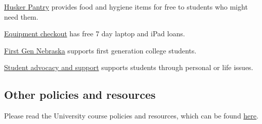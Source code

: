 \documentclass[12pt]{amsart}
\begin{document}
\medskip
\noindent
\href{https://pantry.unl.edu}{Husker Pantry} provides food and hygiene items for free to students who might need them.

\medskip
\noindent
\href{https://services.unl.edu/service/huskertech-laptop-checkout}{Equipment checkout} has free 7 day laptop and iPad loans.


\medskip
\noindent
\href{https://executivevc.unl.edu/evc/initiatives/first-generation-nebraska}{First Gen Nebraska} supports first generation college students. 

\medskip
\noindent
\href{https://studentadvocacy.unl.edu}{Student advocacy and support} supports students through personal or life issues. 


\subsection*{Other policies and resources}Please read the University course policies and resources, which can be found \href{https://executivevc.unl.edu/academic-excellence/teaching-resources/course-policies}{here}.
\end{document}
